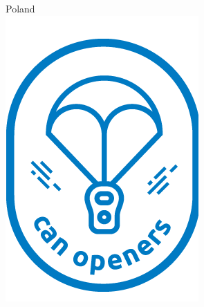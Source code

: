 \documentclass[class=report, crop=false]{standalone}
\begin{document}
\begin{center}
	\Huge
	\textbf{\thetitle}  \\
	\vspace{1em}
	\Large
	\textbf{\theauthor} \\ \vspace{.5em}
	\large\Large
	Poland              \\ 
	\large\Large        
  \includegraphics[width=.7\columnwidth]{ext/logo.png}
\end{center}
\end{document}

